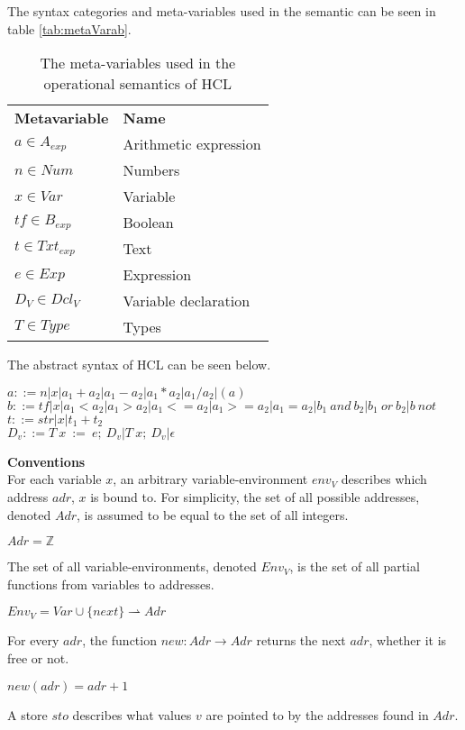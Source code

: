 The syntax categories and meta-variables used in the semantic can be seen in table \ref{tab:metaVarab}. 
\begin{center}
	\begin{table}[ht]
		\centering
		\caption{The meta-variables used in the operational semantics of HCL}
		\label{tab:metaVar}
		\begin{tabular}{ll}
			\textbf{Metavariable} & \textbf{Name} \\
			$a \in A_{exp}$ 	  & Arithmetic expression \\
			$n \in Num$			  & Numbers \\
			$x \in Var$           & Variable \\
			$tf \in B_{exp}$	  & Boolean \\
			$t \in Txt_{exp}$     & Text \\
			$e \in Exp$			  & Expression \\
			$D_V \in Dcl_V$		  & Variable declaration \\
			$T \in Type$          & Types
		\end{tabular}
	\end{table}
\end{center}

The abstract syntax of HCL can be seen below.

$a ::= n | x | a_1+a_2 | a_1-a_2 | a_1*a_2 | a_1/a_2 | (a)$\\
$b ::= tf| x | a_1<a_2 | a_1>a_2 | a_1<=a_2| a_1>=a_2| a_1=a_2 | b_1\ and\ b_2 | b_1\ or\ b_2 | b\ not$\\
$t ::= str| x | t_1 + t_2$\\
$D_v ::= T\ x\ :=\ e;\ D_v | T\ x;\ D_v | \epsilon$

\textbf{\large{Conventions}} \\
For each variable $x$, an arbitrary variable-environment $env_V$ describes which address $adr$, $x$ is bound to.
For simplicity, the set of all possible addresses, denoted $Adr$, is assumed to be equal to the set of all integers.
\begin{center}
	$Adr = \mathbb{Z}$
\end{center}
The set of all variable-environments, denoted \textbf{$Env_V$}, is the set of all partial functions from variables to addresses.
\begin{center}
	$Env_V = Var \cup \{next\} \rightharpoonup Adr$
\end{center}
For every $adr$, the function $new : Adr \rightarrow Adr$ returns the next $adr$, whether it is free or not.
\begin{center}
	$new (adr) = adr + 1$
\end{center}
A store $sto$ describes what values $v$ are pointed to by the addresses found in $Adr$.

